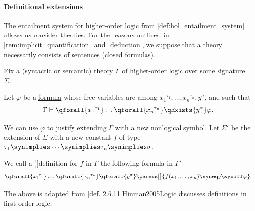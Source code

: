 \paragraph{Definitional extensions}

\begin{definition}\label{def:hol_theory}\mimprovised
  The \hyperref[def:entailment_system]{entailment system} for \hyperref[def:higher_order_logic]{higher-order logic} from \cref{def:hol_entailment_system} allows us consider \hyperref[def:logical_theory]{theories}. For the reasons outlined in \cref{rem:implicit_quantification_and_deduction}, we suppose that a theory necessarily consists of \hyperref[def:hol_closed_expression]{sentences} (closed formulas).
\end{definition}

\begin{definition}\label{def:hol_definition}\mimprovised
  Fix a (syntactic or semantic) \hyperref[def:hol_theory]{theory} \( \Gamma \) of \hyperref[def:higher_order_logic]{higher-order logic} over some \hyperref[def:hol_signature]{signature} \( \Sigma \).

  Let \( \varphi \) be a \hyperref[def:hol_expression/formula]{formula} whose free variables are among \( {x_1}^{\tau_1}, \ldots, {x_n}^{\tau_n}, y^\sigma \), and such that
  \begin{equation}\label{eq:def:hol_definition/sequent}
    \Gamma \vdash \qforall {{x_1}^{\tau_1}} \ldots \qforall {{x_n}^{\tau_n}} \qExists {y^\sigma} \varphi.
  \end{equation}

  We can use \( \varphi \) to justify \hyperref[def:hol_signature_extension]{extending} \( \Gamma \) with a new nonlogical symbol. Let \( \Sigma' \) be the extension of \( \Sigma \) with a new constant \( f \) of type \( \tau_1 \synimplies \cdots \synimplies \tau_n \synimplies \sigma \).

  We call a \term[en=\( \Gamma \)-definition (\cite[def. 2.6.11]{Hinman2005Logic})]{definition} for \( f \) in \( \Gamma \) the following formula in \( \Gamma' \):
  \begin{equation}\label{eq:def:hol_definition/definition}
    \qforall {{x_1}^{\tau_1}} \ldots \qforall {{x_n}^{\tau_n}} \qforall {y^\sigma} \parens[\big]{ f(x_1, \ldots, x_n) \syneq y \syniff \varphi }.
  \end{equation}
\end{definition}
\begin{comments}
  \item The above is adapted from [def. 2.6.11]{Hinman2005Logic} discusses definitions in first-order logic.
\end{comments}

